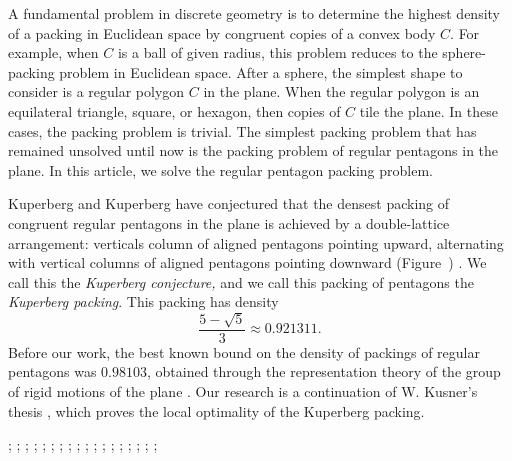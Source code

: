 A fundamental problem in discrete geometry is to determine the highest density of a packing
in Euclidean space by congruent copies of a convex body $C$.   For example, when $C$ is a ball
of given radius, this problem reduces to the sphere-packing problem in Euclidean space.
After a sphere, the simplest shape to consider is a regular polygon $C$ in the plane.
When the regular polygon is an equilateral triangle, square, or hexagon, then copies of $C$ tile
the plane.  In these cases, the packing problem is trivial.  The simplest packing problem
that has remained unsolved until now is the packing problem of regular pentagons in the plane.
In this article, we solve the regular pentagon packing problem.

Kuperberg and Kuperberg
 have conjectured that the
densest packing of congruent regular pentagons in the plane is
achieved by a double-lattice arrangement: verticals column of aligned
pentagons pointing upward, alternating with vertical columns of
aligned pentagons pointing downward (Figure~) \cite{Kup}.  We call this the {\it Kuperberg
  conjecture,}  and we call this packing of pentagons the {\it Kuperberg packing}.
This packing has density
\[
\frac{5 - \sqrt{5}}3 \approx 0.921311.
\] %
Before our work, the best known bound on the density of packings of regular
pentagons was $0.98103$, obtained through the representation theory of the group of rigid motions of the plane \cite{Val}.
Our research is a continuation of W. Kusner's thesis \cite{Kus}, which proves
the local optimality of the Kuperberg packing.


{
;  %
;  %
;  
;  %
; 
;  
;  
;  %
; 
;  
;  
;  %
;  %
; 
;  %
; 
;  
;   
}



